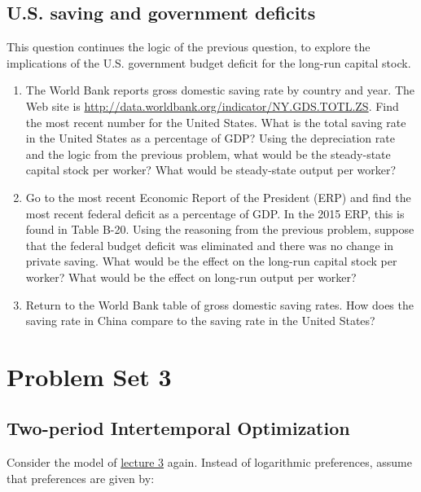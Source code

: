 \documentclass[]{book}
\theoremstyle{definition}
\theoremstyle{definition}
\theoremstyle{definition}
\theoremstyle{remark}
\begin{document}
\section{U.S. saving and government
deficits}\label{u.s.-saving-and-government-deficits}

This question continues the logic of the previous question, to explore
the implications of the U.S. government budget deficit for the long-run
capital stock.

\begin{enumerate}
\def\labelenumi{\arabic{enumi}.}
\item
  The World Bank reports gross domestic saving rate by country and year.
  The Web site is
  \url{http://data.worldbank.org/indicator/NY.GDS.TOTL.ZS}. Find the
  most recent number for the United States. What is the total saving
  rate in the United States as a percentage of GDP? Using the
  depreciation rate and the logic from the previous problem, what would
  be the steady-state capital stock per worker? What would be
  steady-state output per worker?
\item
  Go to the most recent Economic Report of the President (ERP) and find
  the most recent federal deficit as a percentage of GDP. In the 2015
  ERP, this is found in Table B-20. Using the reasoning from the
  previous problem, suppose that the federal budget deficit was
  eliminated and there was no change in private saving. What would be
  the effect on the long-run capital stock per worker? What would be the
  effect on long-run output per worker?
\item
  Return to the World Bank table of gross domestic saving rates. How
  does the saving rate in China compare to the saving rate in the United
  States?
\end{enumerate}

\hypertarget{pset3}{\chapter{Problem Set 3}\label{pset3}}

\section{Two-period Intertemporal
Optimization}\label{two-period-intertemporal-optimization}

Consider the model of \protect\hyperlink{two-period}{lecture 3} again.
Instead of logarithmic preferences, assume that preferences are given
by:
\end{document}

